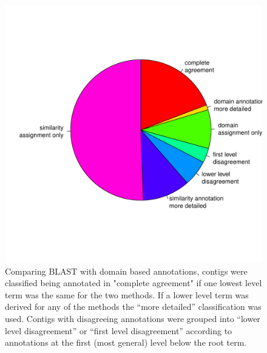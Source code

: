 \documentclass[12pt,a4paper]{article}
\begin{document}
\begin{figure}
  \centering
\includegraphics{GO_pie.pdf}
\caption[Agreement of GO-annotation]{Comparing BLAST with domain based
  annotations, contigs were classified being annotated in "complete
  agreement" if one lowest level term was the same for the two
  methods. If a lower level term was derived for any of the methods
  the ``more detailed'' classification was used. Contigs with
  disagreeing annotations were grouped into ``lower level
  disagreement'' or ``first level disagreement'' according to
  annotations at the first (most general) level below the root term.}
\end{figure}




\newpage
\end{document}

